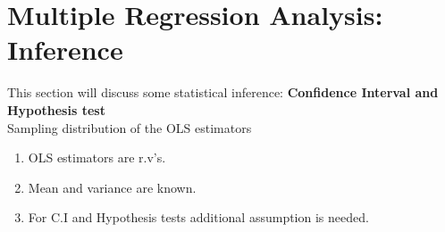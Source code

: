 \documentclass[a4paper, 10pt]{article}
\theoremstyle{definition}	%
\begin{document}
\newpage

\section{Multiple Regression Analysis: Inference}
\setcounter{equation}{0}
\setcounter{theorem}{0}
\setcounter{assumption}{0}
This section will discuss some statistical inference: \textbf{Confidence Interval and Hypothesis test} \\
Sampling distribution of the OLS estimators
\begin{enumerate}
    \item [(i)] OLS estimators are r.v's.
    \item [(ii)] Mean and variance are known. 
    \item[(iii)] For C.I and Hypothesis tests additional assumption is needed. 
\end{enumerate}
\end{document}
